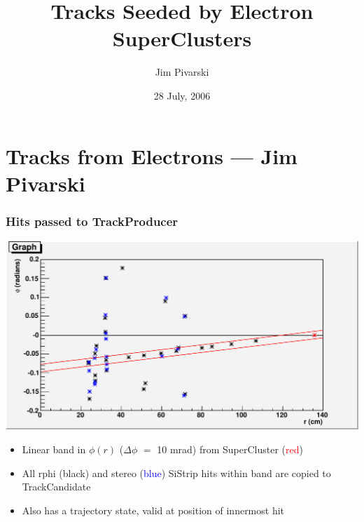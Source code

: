\documentclass[12pt,compress]{beamer}
\title{Tracks Seeded by Electron SuperClusters}
\author{Jim Pivarski}
\institute{Cornell University}
\date{28 July, 2006}
\begin{document}
\addtocounter{page}{-1}
\frame{\titlepage}
\section*{Tracks from Electrons --- Jim Pivarski}

\begin{frame}
\frametitle{Hits passed to TrackProducer}

\begin{center}
\includegraphics[width=0.7\linewidth]{event_display_banded}
\end{center}

\small
\begin{itemize}
\item Linear band in $\phi(r)$ ($\Delta \phi$ $=$ 10 mrad) from SuperCluster (\textcolor{red}{red})
\item All rphi (black) and stereo (\textcolor{blue}{blue}) SiStrip hits within band are copied to TrackCandidate
\item Also has a trajectory state, valid at position of innermost hit
\end{itemize}
\end{frame}
\end{document}
